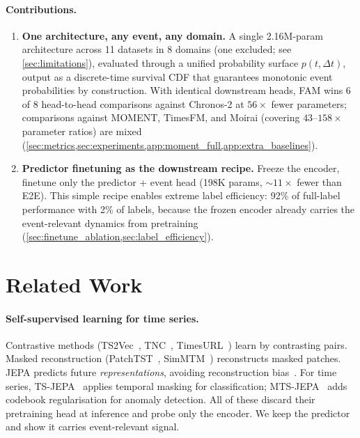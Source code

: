 \documentclass{article}
\begin{document}
\paragraph{Contributions.}
\begin{enumerate}[nosep]
  \item \textbf{One architecture, any event, any domain.} A single 2.16M-param architecture across 11 datasets in 8 domains (one excluded; see \cref{sec:limitations}), evaluated through a unified probability surface $p(t, \Delta t)$, output as a discrete-time survival CDF that guarantees monotonic event probabilities by construction. With identical downstream heads, FAM wins 6 of 8 head-to-head comparisons against Chronos-2 at $56{\times}$ fewer parameters; comparisons against MOMENT, TimesFM, and Moirai (covering $43$--$158{\times}$ parameter ratios) are mixed (\cref{sec:metrics,sec:experiments,app:moment_full,app:extra_baselines}).

  \item \textbf{Predictor finetuning as the downstream recipe.} Freeze the encoder, finetune only the predictor + event head (198K params, ${\sim}11{\times}$ fewer than E2E). This simple recipe enables extreme label efficiency: 92\% of full-label performance with 2\% of labels, because the frozen encoder already carries the event-relevant dynamics from pretraining (\cref{sec:finetune_ablation,sec:label_efficiency}).
\end{enumerate}

\section{Related Work}
\label{sec:related}

\paragraph{Self-supervised learning for time series.}
Contrastive methods (TS2Vec~\citep{yue2022ts2vec}, TNC~\citep{tonekaboni2021tnc}, TimesURL~\citep{liu2024timesurl}) learn by contrasting pairs. Masked reconstruction (PatchTST~\citep{nie2023patchtst}, SimMTM~\citep{dong2023simmtm}) reconstructs masked patches. JEPA predicts future \emph{representations}, avoiding reconstruction bias~\citep{assran2023ijepa,bardes2024vjepa}. For time series, TS-JEPA~\citep{tsjepa2024} applies temporal masking for classification; MTS-JEPA~\citep{mtsjepa2026} adds codebook regularisation for anomaly detection. All of these discard their pretraining head at inference and probe only the encoder. We keep the predictor and show it carries event-relevant signal.
\end{document}
